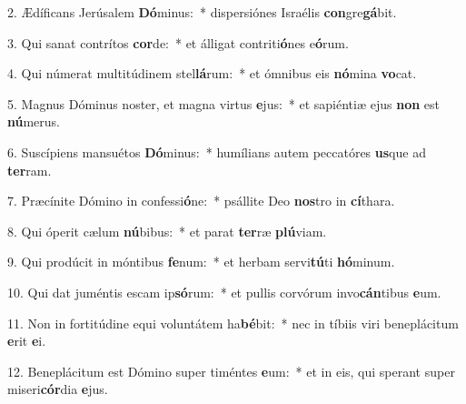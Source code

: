 2. Ædíficans Jerúsalem \textbf{Dó}minus:~*  dispersiónes Israélis \textbf{con}gre\textbf{gá}bit.\

3. Qui sanat contrítos \textbf{cor}de:~*  et álligat contriti\textbf{ó}nes e\textbf{ó}rum.\

4. Qui númerat multitúdinem stel\textbf{lá}rum:~*  et ómnibus eis \textbf{nó}mina \textbf{vo}cat.\

5. Magnus Dóminus noster, et magna virtus \textbf{e}jus:~*  et sapiéntiæ ejus \textbf{non} est \textbf{nú}merus.\

6. Suscípiens mansuétos \textbf{Dó}minus:~*  humílians autem peccatóres \textbf{us}que ad \textbf{ter}ram.\

7. Præcínite Dómino in confessi\textbf{ó}ne:~*  psállite Deo \textbf{nos}tro in \textbf{cí}thara.\

8. Qui óperit cælum \textbf{nú}bibus:~*  et parat \textbf{ter}ræ \textbf{plú}viam.\

9. Qui prodúcit in móntibus \textbf{fe}num:~*  et herbam servi\textbf{tú}ti \textbf{hó}minum.\

10. Qui dat juméntis escam ip\textbf{só}rum:~*  et pullis corvórum invo\textbf{cán}tibus \textbf{e}um.\

11. Non in fortitúdine equi voluntátem ha\textbf{bé}bit:~*  nec in tíbiis viri beneplácitum \textbf{e}rit \textbf{e}i.\

12. Beneplácitum est Dómino super timéntes \textbf{e}um:~*  et in eis, qui sperant super miseri\textbf{cór}dia \textbf{e}jus.\

